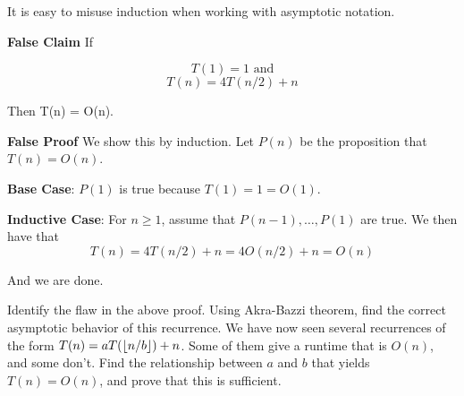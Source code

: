 \documentclass[12pt,twoside]{article}
\begin{document}
\begin{problem}{20}
It is easy to misuse induction when working with asymptotic notation.

\textbf{False Claim}  If

$$T(1) = 1 \textrm{ and}$$
$$T(n) = 4T(n/2) + n$$

Then T(n) = O(n).

\textbf{False Proof}
We show this by induction.  Let $P(n)$ be the proposition that $T(n) = O(n)$.  

\textbf{Base Case}:
$P(1)$ is true because $T(1) = 1 = O(1)$. 

\textbf{Inductive Case}: 
For $n \geq 1$, assume that $P(n-1), \ldots, P(1)$ are true.  We then have that
$$T(n) = 4T(n/2) + n = 4O(n/2) + n = O(n)$$

And we are done.

\bparts
	 Identify the flaw in the above proof.  
	 Using Akra-Bazzi theorem, find the correct asymptotic behavior of this recurrence.
	 We have now seen several recurrences of the form $T(n) = aT(\left\lfloor n/b\right\rfloor) + n$.  Some of them give a runtime that is $O(n)$, and some don't.  Find the relationship
	between $a$ and $b$ that yields $T(n) = O(n)$, and prove that this is sufficient.
	
\eparts
\end{problem}
\end{document}
